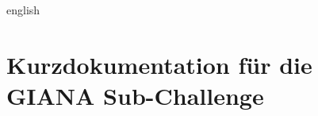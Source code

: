 






\tableofcontents

\clearpage
{}
\begin{abstract}
	
\end{abstract}

\clearpage
{}
\begin{otherlanguage*}{english}
\begin{abstract}
	
\end{abstract}
\end{otherlanguage*}









\listoffigures
\listoftables
\printglossary[type=\acronymtype,title={Abkürzungsverzeichnis}]
\printbibliography[heading=bibintoc]

\appendix
\chapter{Kurzdokumentation für die GIANA Sub-Challenge}





